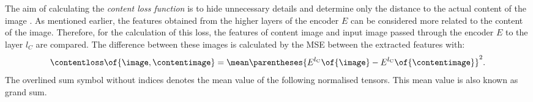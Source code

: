 The aim of calculating the \emph{content loss function} \contentloss{} is to hide unnecessary details and determine only the distance to the actual content of the image \cite{Glas2021}. As mentioned earlier, the features obtained from the higher layers of the encoder $E$ can be considered more related to the content of the image. Therefore, for the calculation of this loss, the features of content image and input image passed through the encoder $E$ to the layer $l_C$ are compared. The difference between these images is calculated by the \gls{MSE} between the extracted features with:
\begin{equation*}
	\contentloss\of{\image\eqcommasep \contentimage} = \mean \parentheses{E^{l_\text{C}}\of{\image} - E^{l_\text{C}}\of{\contentimage}}^2 \eqtextdot
\end{equation*}
The overlined sum symbol without indices denotes the mean value of the following normalised tensors. This mean value is also known as grand sum.

